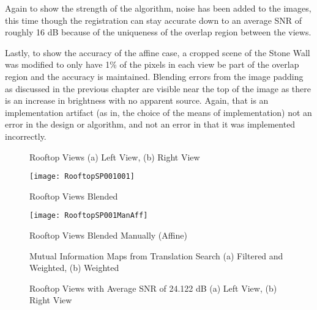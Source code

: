 Again to show the strength of the algorithm, noise has been added to the images, this time though the registration can stay accurate down to an average SNR of roughly 16 dB because of the uniqueness of the overlap region between the views.

Lastly, to show the accuracy of the affine case, a cropped scene of the Stone Wall was modified to only have 1\% of the pixels in each view be part of the overlap region and the accuracy is maintained. Blending errors from the image padding as discussed in the previous chapter are visible near the top of the image as there is an increase in brightness with no apparent source. Again, that is an implementation artifact (as in, the choice of the means of implementation) not an error in the design or algorithm, and not an error in that it was implemented incorrectly.

\begin{figure}
\label{RooftopImages}
\centering
{}
\caption{Rooftop Views (a) Left View, (b) Right View}
\end{figure}

\begin{figure}
\centering
\texttt{[image: RooftopSP001001]}
\caption{Rooftop Views Blended}
\label{RooftopStitched}
\end{figure}

\begin{figure}
\centering
\texttt{[image: RooftopSP001ManAff]}
\caption{Rooftop Views Blended Manually (Affine)}
\label{RooftopStitchedManual}
\end{figure}

\begin{figure}
\centering
{}
\caption{Mutual Information Maps from Translation Search (a) Filtered and Weighted, (b) Weighted}
\label{RooftopNoisyImagesMI}
\end{figure}

\begin{figure}
\centering
{}
\caption{Rooftop Views with Average SNR of 24.122 dB (a) Left View, (b) Right View}
\label{RooftopNoisyImages}
\end{figure}

